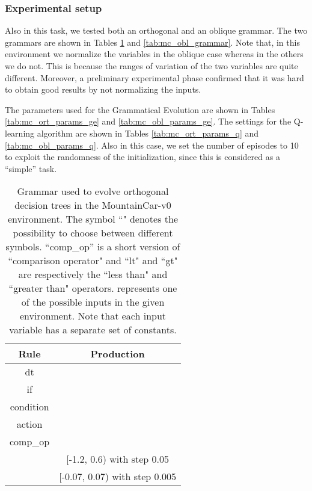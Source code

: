 \documentclass[review,english]{elsarticle}
\begin{document}
\subsubsection{Experimental setup}
Also in this task, we tested both an orthogonal and an oblique grammar.
The two grammars are shown in Tables \ref{tab:mc_ort_grammar} and \ref{tab:mc_obl_grammar}. 
Note that, in this environment we normalize the variables in the oblique case whereas in the others we do not.
This is because the ranges of variation of the two variables are quite different. 
Moreover, a preliminary experimental phase confirmed that it was hard to obtain good results by not normalizing the inputs.

The parameters used for the Grammatical Evolution are shown in Tables \ref{tab:mc_ort_params_ge} and \ref{tab:mc_obl_params_ge}.
The settings for the Q-learning algorithm are shown in Tables \ref{tab:mc_ort_params_q} and \ref{tab:mc_obl_params_q}.
Also in this case, we set the number of episodes to 10 to exploit the randomness of the initialization, since this is considered as a ``simple'' task.

\begin{table}
    \centering
    \begin{tabular}{|c|c|} \hline
        \textbf{Rule} & \textbf{Production} \\ \hline
        dt &  \\ if &  \\ condition &  \\ action &  \\ comp\_op &  \\  & [-1.2, 0.6) with step 0.05 \\  & [-0.07, 0.07) with step 0.005 \\ \hline
    \end{tabular}
    \caption{Grammar used to evolve orthogonal decision trees in the MountainCar-v0 environment. The symbol ``" denotes the possibility to choose between different symbols. ``comp\_op'' is a short version of ``comparison operator" and ``lt" and ``gt" are respectively the ``less than" and ``greater than" operators.  represents one of the possible inputs in the given environment. Note that each input variable has a separate set of constants.}
    \label{tab:mc_ort_grammar}
\end{table}
\end{document}
